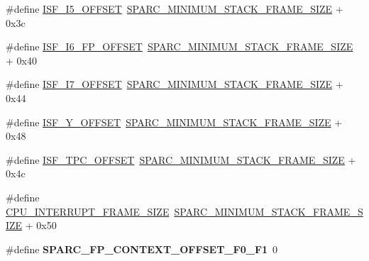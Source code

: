 \begin{DoxyCompactItemize}
\item 
\#define \mbox{\hyperlink{group__RTEMSScoreCPUSPARC_gac5e327b8d3e2952900125780c27d462c}{I\+S\+F\+\_\+\+I5\+\_\+\+O\+F\+F\+S\+ET}}~\mbox{\hyperlink{group__RTEMSScoreCPUSPARC_ga8e296685f05588131b26bdc695cb9b8c}{S\+P\+A\+R\+C\+\_\+\+M\+I\+N\+I\+M\+U\+M\+\_\+\+S\+T\+A\+C\+K\+\_\+\+F\+R\+A\+M\+E\+\_\+\+S\+I\+ZE}} + 0x3c
\item 
\#define \mbox{\hyperlink{group__RTEMSScoreCPUSPARC_gaf5a868390e8bb7d39bfe76933d7814dc}{I\+S\+F\+\_\+\+I6\+\_\+\+F\+P\+\_\+\+O\+F\+F\+S\+ET}}~\mbox{\hyperlink{group__RTEMSScoreCPUSPARC_ga8e296685f05588131b26bdc695cb9b8c}{S\+P\+A\+R\+C\+\_\+\+M\+I\+N\+I\+M\+U\+M\+\_\+\+S\+T\+A\+C\+K\+\_\+\+F\+R\+A\+M\+E\+\_\+\+S\+I\+ZE}} + 0x40
\item 
\#define \mbox{\hyperlink{group__RTEMSScoreCPUSPARC_ga942f71395a11bbaa70b3dd49e4d30c40}{I\+S\+F\+\_\+\+I7\+\_\+\+O\+F\+F\+S\+ET}}~\mbox{\hyperlink{group__RTEMSScoreCPUSPARC_ga8e296685f05588131b26bdc695cb9b8c}{S\+P\+A\+R\+C\+\_\+\+M\+I\+N\+I\+M\+U\+M\+\_\+\+S\+T\+A\+C\+K\+\_\+\+F\+R\+A\+M\+E\+\_\+\+S\+I\+ZE}} + 0x44
\item 
\#define \mbox{\hyperlink{group__RTEMSScoreCPUSPARC_ga81c1c72501e6ead53235a54851e75ca8}{I\+S\+F\+\_\+\+Y\+\_\+\+O\+F\+F\+S\+ET}}~\mbox{\hyperlink{group__RTEMSScoreCPUSPARC_ga8e296685f05588131b26bdc695cb9b8c}{S\+P\+A\+R\+C\+\_\+\+M\+I\+N\+I\+M\+U\+M\+\_\+\+S\+T\+A\+C\+K\+\_\+\+F\+R\+A\+M\+E\+\_\+\+S\+I\+ZE}} + 0x48
\item 
\#define \mbox{\hyperlink{group__RTEMSScoreCPUSPARC_gab1d2d78c3e9d2842262e527b7db82460}{I\+S\+F\+\_\+\+T\+P\+C\+\_\+\+O\+F\+F\+S\+ET}}~\mbox{\hyperlink{group__RTEMSScoreCPUSPARC_ga8e296685f05588131b26bdc695cb9b8c}{S\+P\+A\+R\+C\+\_\+\+M\+I\+N\+I\+M\+U\+M\+\_\+\+S\+T\+A\+C\+K\+\_\+\+F\+R\+A\+M\+E\+\_\+\+S\+I\+ZE}} + 0x4c
\item 
\#define \mbox{\hyperlink{group__RTEMSScoreCPUSPARC_gac17ddadf3ff0907a3beefb6d72b1563f}{C\+P\+U\+\_\+\+I\+N\+T\+E\+R\+R\+U\+P\+T\+\_\+\+F\+R\+A\+M\+E\+\_\+\+S\+I\+ZE}}~\mbox{\hyperlink{group__RTEMSScoreCPUSPARC_ga8e296685f05588131b26bdc695cb9b8c}{S\+P\+A\+R\+C\+\_\+\+M\+I\+N\+I\+M\+U\+M\+\_\+\+S\+T\+A\+C\+K\+\_\+\+F\+R\+A\+M\+E\+\_\+\+S\+I\+ZE}} + 0x50
\item 
\mbox{\label{group__RTEMSScoreCPUSPARC_gaf1929b043aea418282ebf562f868f2e5}} 
\#define {\bfseries S\+P\+A\+R\+C\+\_\+\+F\+P\+\_\+\+C\+O\+N\+T\+E\+X\+T\+\_\+\+O\+F\+F\+S\+E\+T\+\_\+\+F0\+\_\+\+F1}~0
\item 

\end{DoxyCompactItemize}
